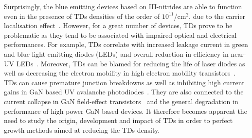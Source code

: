 Surprisingly, the blue emitting devices based on III-nitrides are able to function even in the presence of TDs  densities of the order of $10^{11}$/cm$^2$, due to the carrier localisation effect~\cite{Graham}. However, for a great number of devices, TDs prove to be problematic as they tend to be associated with impaired optical and electrical performances. For example, TDs correlate with increased leakage current in green and blue light emitting diodes (LEDs) \cite{Ferdous} and overall reduction in efficiency in near-UV LEDs~\cite{Kamiyama}. Moreover, TDs can be blamed for reducing the life of laser diodes as well as decreasing the electron mobility in high electron mobility transistors~\cite{Bougrioua}. TDs can cause premature junction breakdowns as well as inhibiting high current gains in GaN based UV avalanche photodiodes~\cite{Limb}. They are also connected to the current collapse in GaN field-effect transistors~\cite{Disanto} and the general degradation in performance of high power GaN based devices. It therefore becomes apparent the need to study the origin, development and impact of TDs in order to perfect growth methods aimed at reducing the TDs density.



